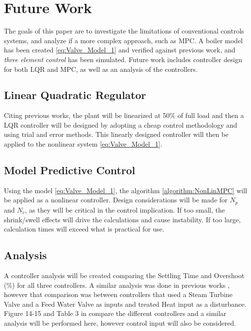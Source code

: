 \chapter{Future Work}

The goals of this paper are to investigate the limitations of conventional controls systems, and analyze if a more complex approach, such as MPC. A boiler model has been created \eqref{eq:Valve_Model_1} and verified against previous work, and {\it three element control} has been simulated. Future work includes controller design for both LQR and MPC, as well as an analysis of the controllers. 

\section{Linear Quadratic Regulator}

    Citing previous works, the plant will be linearized at 50\% of full load and then a LQR controller will be designed by adopting a cheap control methodology and using trial and error methods. This linearly designed controller will then be applied to the nonlinear system \eqref{eq:Valve_Model_1}.

\section{Model Predictive Control}

    Using the model \eqref{eq:Valve_Model_1}, the algorithm \ref{algorithm:NonLinMPC} will be applied as a nonlinear controller. Design considerations will be made for $N_p$ and $N_c$, as they will be critical in the control implication. If too small, the shrink/swell effects will drive the calculations and cause instability. If too large, calculation times will exceed what is practical for use. 

\section{Analysis}

    A controller analysis will be created comparing the Settling Time and Overshoot (\%) for all three controllers. A similar analysis was done in previous works \cite{Panwar}, however that comparison was between controllers that used a Steam Turbine Valve and a Feed Water Valve as inputs and treated Heat input as a disturbance. Figure 14-15 and Table 3 in \cite{Panwar} compare the different controllers and a similar analysis will be performed here, however control input will also be considered. 